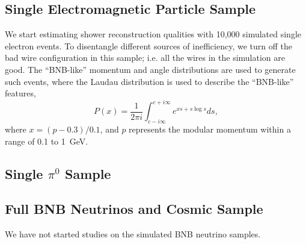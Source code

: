 \subsection{Single Electromagnetic Particle Sample}
\label{sec:single_em}

We start estimating shower reconstruction qualities with 10,000 simulated
single electron events.
To disentangle different sources of inefficiency, we turn off the bad wire
configuration in this sample; i.e. all the wires in the simulation are good.
The ``BNB-like'' momentum and angle distributions are used to generate 
such events, where the Laudau distribution is used to describe the ``BNB-like''
features,
\begin{equation}
\label{eq:bnb-like-p}
P(x) = \frac{1}{2\pi i}\int^{c+i\infty}_{c-i\infty}e^{xs+s\log s}ds,
\end{equation}
where $x = (p-0.3)/0.1$, and $p$ represents the modular momentum within
a range of 0.1 to 1~GeV.


\subsection{Single $\pi^0$ Sample}
\label{sec:single_pi0}

\subsection{Full BNB Neutrinos and Cosmic Sample}
\label{sec:bnb}

We have not started studies on the simulated BNB neutrino samples.


